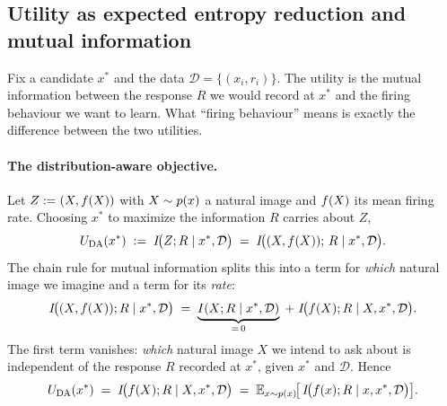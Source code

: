 \subsection{Utility as expected entropy reduction and mutual information}
\label{subsec:mi}

Fix a candidate $x^{*}$ and the data $\mathcal D=\{(x_i,r_i)\}$. The utility is the
mutual information between the response $R$ we would record at $x^{*}$ and the
firing behaviour we want to learn. What ``firing behaviour'' means is exactly the
difference between the two utilities.

\paragraph{The distribution-aware objective.}
Let $Z:=(X,f(X))$ with $X\sim p(x)$ a natural image and $f(X)$ its mean
firing rate. Choosing $x^{*}$ to maximize the information $R$ carries about $Z$,
%
\begin{equation}
  U_{\mathrm{DA}}(x^{*}) \;:=\; I\!\big(Z;R\mid x^{*},\mathcal D\big)
             \;=\; I\!\big((X,f(X));\,R\mid x^{*},\mathcal D\big).
  \label{eq:da-objective}
\end{equation}
%
The chain rule for mutual information splits this into a term for \emph{which}
natural image we imagine and a term for its \emph{rate}:
%
\begin{equation}
  I\!\big((X,f(X));R\mid x^{*},\mathcal D\big)
  \;=\;
  \underbrace{I(X;R\mid x^{*},\mathcal D)}_{=\,0}
  \;+\;
  I\!\big(f(X);R\mid X,x^{*},\mathcal D\big).
  \label{eq:mi-chain}
\end{equation}
%
The first term vanishes: \emph{which} natural image $X$ we intend to ask about is
independent of the response $R$ recorded at $x^{*}$, given $x^{*}$ and
$\mathcal D$. Hence
%
\begin{equation}
  U_{\mathrm{DA}}(x^{*})
  \;=\; I\!\big(f(X);R\mid X,x^{*},\mathcal D\big)
  \;=\; \mathbb{E}_{x\sim p(x)}\!\big[\,I\!\big(f(x);R\mid x,x^{*},\mathcal D\big)\big].
  \label{eq:da-expectation}
\end{equation}

